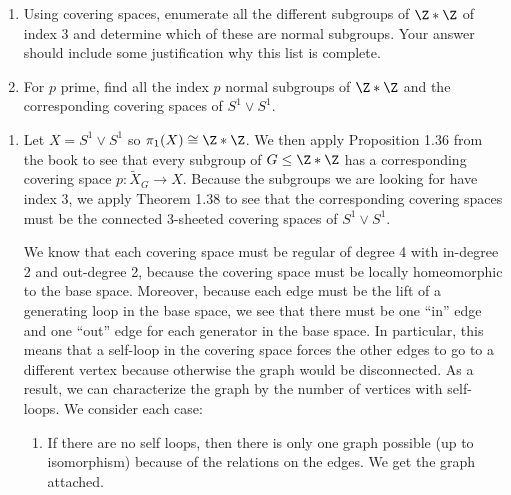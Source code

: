 \documentclass{article}
\begin{document}
\begin{problem}{4}{0cm}
  \vspace*{-\bigskipamount}
  \begin{enumerate}
  \item Using covering spaces, enumerate all the different subgroups
    of $\Z \ast \Z$ of index 3 and determine which of these are normal
    subgroups. Your answer should include some justification why this
    list is complete.
  \item For $p$ prime, find all the index $p$ normal subgroups of $\Z
    \ast \Z$ and the corresponding covering spaces of $S^1 \vee S^1$.
  \end{enumerate}
\end{problem}

\begin{solution}{0cm}
  \begin{enumerate}
  \item Let $X = S^1 \vee S^1$ so $\pi_1(X) \cong \Z \ast \Z$. We
    then apply Proposition 1.36 from the book to see that every
    subgroup of $G \leq \Z \ast \Z$ has a corresponding covering space
    $p: \tilde{X}_G \to X$. Because the subgroups we are looking for
    have index 3, we apply Theorem 1.38 to see that the corresponding
    covering spaces must be the connected 3-sheeted covering spaces of
    $S^1 \vee S^1$. 

    We know that each covering space must be regular of degree 4 with
    in-degree 2 and out-degree 2, because the covering space must be
    locally homeomorphic to the base space. Moreover, because each
    edge must be the lift of a generating loop in the base space, we
    see that there must be one ``in'' edge and one ``out'' edge for
    each generator in the base space. In particular, this means that
    a self-loop in the covering space forces the other edges to go to
    a different vertex because otherwise the graph would be
    disconnected. As a result, we can characterize the graph by the
    number of vertices with self-loops. We consider each case:
    \begin{enumerate}
    \item If there are no self loops, then there is only one graph
      possible (up to isomorphism) because of the relations on the
      edges. We get the graph attached.


\end{enumerate}
\end{enumerate}
\end{solution}
\end{document}
